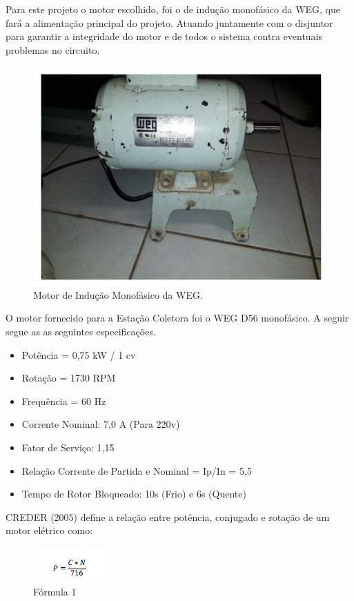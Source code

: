 Para este projeto o motor escolhido, foi o de indução monofásico da WEG, que fará a alimentação principal do projeto. Atuando juntamente com o disjuntor para garantir a integridade do motor e de todos o sistema contra eventuais problemas no circuito. 

\begin{figure}[!h]
	\centering
		\includegraphics[scale=0.5]{figuras/energia/2.png}
	\caption{Motor de Indução Monofásico da WEG.}
\end{figure}

O motor fornecido para a Estação Coletora foi o WEG D56 monofásico. A seguir segue as  as seguintes especificações.

\begin{itemize}
    \item Potência = 0,75 kW / 1 cv
    \item Rotação = 1730 RPM
    \item Frequência = 60 Hz
    \item Corrente Nominal: 7,0 A (Para 220v)
    \item Fator de Serviço: 1,15
    \item Relação Corrente de Partida e Nominal = Ip/In = 5,5
    \item Tempo de Rotor Bloqueado: 10s (Frio) e 6s (Quente)
\end{itemize}

CREDER (2005) define a relação entre potência, conjugado e rotação de um motor elétrico como:

\begin{figure}[!h]
	\centering
		\includegraphics[scale=0.9]{figuras/energia/3.png}
	\caption{Fórmula 1}
\end{figure}

